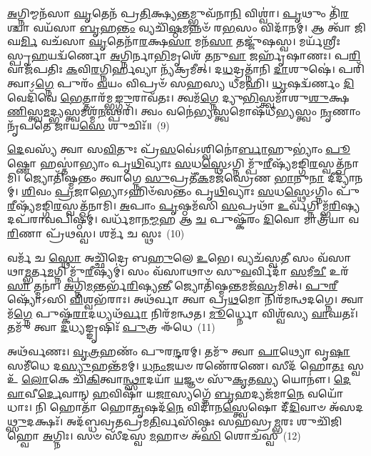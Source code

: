 \-\ul{𑌅}\-𑌗𑍍𑌨𑌿𑌮𑍍𑌮𑌨᳴𑌸𑌾 \ul{𑌘𑍃}\-𑌤𑍇𑌨᳴ 𑌪𑍍𑌰\-\ul{𑌤𑌿}\-𑌕𑍍𑌷𑍍𑌯\-\ul{𑌨𑍍𑌤}\-𑌮𑍍𑌭𑍁𑌵᳴𑌨𑌾\-\ul{𑌨𑌿} 𑌵𑌿𑌶𑍍𑌵𑌾॑। \ul{𑌪𑍃}\-𑌥𑍁𑌂 𑌤𑌿᳴\-\ul{𑌰}\-𑌶𑍍𑌚𑌾 𑌵𑌯᳴𑌸𑌾 \ul{𑌬𑍃}\-𑌹\-\ul{𑌨𑍍𑌤𑌂} 𑌵𑍍𑌯𑌚𑌿᳴\-\ul{𑌷𑍍𑌠}\-𑌮𑌨𑍍𑌨𑍞᳴ 𑌰\-\ul{𑌭}\-𑌸𑌂 𑌵𑌿𑌦𑌾᳴𑌨𑌮𑍍। 𑌆 𑌤𑍍𑌵𑌾᳴ 𑌜𑌿𑌘\-\ul{𑌰𑍍𑌮𑌿} 𑌵𑌚᳴𑌸𑌾 \ul{𑌘𑍃}\-𑌤𑍇𑌨𑌾᳴\-\ul{𑌰}\-𑌕𑍍𑌷\-\ul{𑌸𑌾} 𑌮𑌨᳴\-\ul{𑌸𑌾} 𑌤𑌜𑍍𑌜𑍁᳴𑌷𑌸𑍍𑌵। 𑌮𑌰𑍍𑌯᳴𑌶𑍍𑌰𑍀𑌃 𑌸𑍍𑌪𑍃\-\ul{𑌹}\-𑌯𑌦𑍍𑌵᳴𑌰𑍍𑌣𑍋 \ul{𑌅}\-𑌗𑍍𑌨𑌿𑌰𑍍𑌨𑌾\-\ul{𑌭𑌿}\-𑌮𑍃𑌶𑍇᳴ \ul{𑌤}\-𑌨𑍁\-\ul{𑌵𑌾} 𑌜𑌰𑍍\mbox{}𑌹𑍃᳴𑌷𑌾𑌣𑌃। 𑌪\-\ul{𑌰𑌿} 𑌵𑌾𑌜᳴𑌪𑌤𑌿𑌃 \ul{𑌕}\-𑌵𑌿\-\ul{𑌰}\-𑌗𑍍𑌨𑌿𑌰𑍍\mbox{}\-\ul{𑌹}\-𑌵𑍍𑌯𑌾 𑌨𑍍𑌯᳴𑌕𑍍𑌰𑌮𑍀𑌤𑍍। 𑌦\-\ul{𑌧}\-𑌦𑍍𑌰𑌤𑍍𑌨𑌾᳴𑌨𑌿 \ul{𑌦𑌾}\-𑌶𑍁𑌷𑍇॑। 𑌪𑌰𑌿᳴ 𑌤𑍍𑌵𑌾𑌽\-\ul{𑌗𑍍𑌨𑍇} 𑌪𑍁𑌰𑌂᳴ \ul{𑌵}\-𑌯𑌂 𑌵𑌿𑌪𑍍𑌰𑍞᳴ 𑌸𑌹𑌸𑍍𑌯 𑌧𑍀𑌮𑌹𑌿। \ul{𑌧𑍃}\-𑌷𑌦𑍍𑌵᳴𑌰𑍍𑌣𑌂 \ul{𑌦𑌿}\-𑌵𑍇𑌦𑌿᳴𑌵𑍇 \ul{𑌭𑍇}\-𑌤𑍍𑌤𑌾𑌰᳴𑌮𑍍𑌭\-\ul{𑌙𑍍𑌗𑍁}\-॒𑌰𑌾𑌵᳴𑌤𑌃। 𑌤𑍍𑌵𑌮᳴\-\ul{𑌗𑍍𑌨𑍇} 𑌦𑍍𑌯𑍁\-\ul{𑌭𑌿}\-𑌸𑍍𑌤𑍍𑌵𑌮𑌾᳴𑌶𑍁\-\ul{𑌶𑍁}\-𑌕𑍍𑌷\-\ul{𑌣𑌿}\-𑌸𑍍𑌤𑍍𑌵\-\ul{𑌮}\-𑌦𑍍𑌭𑍍𑌯𑌸𑍍𑌤𑍍𑌵𑌮𑌶𑍍𑌮᳴\-\ul{𑌨}\-𑌸𑍍𑌪𑌰𑌿᳴। 𑌤𑍍𑌵𑌂 𑌵𑌨𑍇॑\-\ul{𑌭𑍍𑌯}\-𑌸𑍍𑌤𑍍𑌵𑌮𑍋𑌷᳴𑌧𑍀\-\ul{𑌭𑍍𑌯}\-𑌸𑍍𑌤𑍍𑌵𑌂 \ul{𑌨𑍃}\-𑌣𑌾𑌂 𑌨𑍃᳴𑌪𑌤𑍇 𑌜𑌾𑌯\-\ul{𑌸𑍇} 𑌶𑍁𑌚𑌿𑌃᳴॥~(9)

{\anuvakamend[{\-\ul{𑌪𑍍𑌰}\-𑌤𑍂\-\ul{𑌰𑍍𑌵}\-𑌨𑍍𑌥𑍍𑌸𑍂𑌰𑍍𑌯᳴𑌸𑍍𑌯 𑌤𑌿\-\ul{𑌷𑍍𑌠} 𑌜𑌿𑌘᳴𑌰𑍍𑌮𑌿 \ul{𑌭𑍇}\-𑌤𑍍𑌤𑌾𑌰𑌂᳴ 𑌵𑌿𑍞\-\ul{𑌶}\-𑌤𑌿𑌶𑍍𑌚᳴}]}%

\-\ul{𑌦𑍇}\-𑌵𑌸𑍍𑌯᳴ 𑌤𑍍𑌵𑌾 𑌸\-\ul{𑌵𑌿}\-𑌤𑍁𑌃 𑌪𑍍𑌰᳴\-\ul{𑌸}\-𑌵𑍇॑\-𑌽𑌶𑍍𑌵𑌿𑌨𑍋॑\-\ul{𑌰𑍍𑌬𑌾}\-𑌹𑍁\-𑌭𑍍𑌯𑌾𑌂॑ \ul{𑌪𑍂}\-𑌷𑍍𑌣𑍋 𑌹𑌸𑍍𑌤𑌾॑𑌭𑍍𑌯𑌾𑌂 𑌪𑍃\-\ul{𑌥𑌿}\-𑌵𑍍𑌯𑌾𑌃 \ul{𑌸}\-𑌧\-\ul{𑌸𑍍𑌥𑍇}\-\-𑌽𑌗𑍍𑌨𑌿𑌮𑍍𑌪𑍁᳴\-\ul{𑌰𑍀}\-𑌷𑍍𑌯᳴𑌮𑌙𑍍𑌗𑌿\-\ul{𑌰}\-𑌸𑍍𑌵\-𑌤𑍍𑌖᳴𑌨𑌾𑌮𑌿। 𑌜𑍍𑌯𑍋𑌤𑌿᳴𑌷𑍍𑌮𑌨𑍍𑌤𑌂 𑌤𑍍𑌵𑌾𑌗𑍍𑌨𑍇 \ul{𑌸𑍁}\-𑌪𑍍𑌰𑌤𑍀᳴\-\ul{𑌕}\-𑌮𑌜᳴𑌸𑍍𑌰𑍇𑌣 \ul{𑌭𑌾}\-𑌨𑍁\-\ul{𑌨𑌾} 𑌦𑍀𑌦𑍍𑌯𑌾᳴𑌨𑌮𑍍। \ul{𑌶𑌿}\-𑌵𑌂 \ul{𑌪𑍍𑌰}\-𑌜𑌾𑌭𑍍𑌯𑍋\-𑌽𑌹𑌿𑍞᳴𑌸𑌨𑍍𑌤𑌂 𑌪𑍃\-\ul{𑌥𑌿}\-𑌵𑍍𑌯𑌾𑌃 \ul{𑌸}\-𑌧\-\ul{𑌸𑍍𑌥𑍇}\-\-𑌽𑌗𑍍𑌨𑌿𑌂 𑌪𑍁᳴\-\ul{𑌰𑍀}\-𑌷𑍍𑌯᳴𑌮𑌙𑍍𑌗𑌿\-\ul{𑌰}\-𑌸𑍍𑌵𑌤𑍍𑌖᳴𑌨𑌾𑌮𑌿। \ul{𑌅}\-𑌪𑌾𑌂 \ul{𑌪𑍃}\-𑌷𑍍𑌠𑌮᳴𑌸𑌿 \ul{𑌸}\-𑌪𑍍𑌰𑌥𑌾᳴ \ul{𑌉}\-𑌰𑍍𑌵᳴𑌗𑍍𑌨𑌿𑌮𑍍𑌭᳴\-\ul{𑌰𑌿}\-𑌷𑍍𑌯𑌦𑌪᳴𑌰𑌾𑌵𑌪𑌿𑌷𑍍𑌠𑌮𑍍। 𑌵𑌰𑍍𑌧᳴𑌮𑌾𑌨\-\ul{𑌮𑍍𑌮}\-𑌹 𑌆 \ul{𑌚} 𑌪𑍁𑌷𑍍𑌕᳴𑌰𑌂 \ul{𑌦𑌿}\-𑌵𑍋 𑌮𑌾𑌤𑍍𑌰᳴𑌯𑌾 𑌵\-\ul{𑌰𑌿}\-𑌣𑌾 𑌪𑍍𑌰᳴𑌥𑌸𑍍𑌵। 𑌶𑌰𑍍𑌮᳴ 𑌚 𑌸𑍍𑌥𑌃~(10)

𑌵𑌰𑍍𑌮᳴ 𑌚 \ul{𑌸𑍍𑌥𑍋} 𑌅𑌚𑍍𑌛𑌿᳴𑌦𑍍𑌰𑍇 𑌬\-\ul{𑌹𑍁}\-𑌲𑍇 \ul{𑌉}\-𑌭𑍇। 𑌵𑍍𑌯𑌚᳴𑌸𑍍𑌵\-\ul{𑌤𑍀} 𑌸𑌂 𑌵᳴𑌸𑌾𑌥𑌾\-\ul{𑌮𑍍𑌭}\-𑌰𑍍𑌤\-\ul{𑌮}\-𑌗𑍍𑌨𑌿𑌮𑍍𑌪𑍁᳴\-\ul{𑌰𑍀}\-𑌷𑍍𑌯𑌮𑍍॑। 𑌸𑌂 𑌵᳴𑌸𑌾𑌥𑌾𑍞 𑌸𑍁\-\ul{𑌵}\-𑌰𑍍𑌵𑌿𑌦𑌾᳴ \ul{𑌸}\-𑌮𑍀\-\ul{𑌚𑍀} 𑌉𑌰᳴\-\ul{𑌸𑌾} 𑌤𑍍𑌮𑌨𑌾॑। \ul{𑌅}\-𑌗𑍍𑌨𑌿\-\ul{𑌮}\-𑌨𑍍𑌤𑌰𑍍𑌭᳴\-\ul{𑌰𑌿}\-𑌷𑍍𑌯\-\ul{𑌨𑍍𑌤𑍀} 𑌜𑍍𑌯𑍋𑌤𑌿᳴𑌷𑍍𑌮\-\ul{𑌨𑍍𑌤}\-𑌮𑌜᳴\-\ul{𑌸𑍍𑌰}\-𑌮𑌿𑌤𑍍। \ul{𑌪𑍁}\-\-\ul{𑌰𑍀}\-𑌷𑍍𑌯𑍋᳴\-𑌽𑌸𑌿 \ul{𑌵𑌿}\-𑌶𑍍𑌵𑌭᳴𑌰𑌾𑌃। 𑌅𑌥᳴𑌰𑍍𑌵𑌾 𑌤𑍍𑌵𑌾 𑌪𑍍𑌰\-\ul{𑌥}\-𑌮𑍋 𑌨𑌿𑌰᳴𑌮𑌨𑍍𑌥𑌦𑌗𑍍𑌨𑍇। 𑌤𑍍𑌵𑌾𑌮᳴\-\ul{𑌗𑍍𑌨𑍇} 𑌪𑍁𑌷𑍍𑌕᳴\-\ul{𑌰𑌾}\-𑌦𑌧𑍍𑌯𑌥᳴\-\ul{𑌰𑍍𑌵𑌾} 𑌨𑌿𑌰᳴𑌮𑌨𑍍𑌥𑌤। \ul{𑌮𑍂}\-𑌰𑍍𑌧𑍍𑌨𑍋 𑌵𑌿𑌶𑍍𑌵᳴𑌸𑍍𑌯 \ul{𑌵𑌾}\-𑌘𑌤𑌃᳴। 𑌤𑌮𑍁᳴ 𑌤𑍍𑌵𑌾 \ul{𑌦}\-𑌧𑍍𑌯𑌙𑍍𑌙𑍃𑌷𑌿𑌃᳴ \ul{𑌪𑍁}\-𑌤𑍍𑌰 𑌈᳴𑌧𑍇~(11)

𑌅𑌥᳴𑌰𑍍𑌵𑌣𑌃। \ul{𑌵𑍃}\-\-\ul{𑌤𑍍𑌰}\-𑌹𑌣𑌂᳴ 𑌪𑍁𑌰\-\ul{𑌨𑍍𑌦}\-𑌰𑌮𑍍। 𑌤𑌮𑍁᳴ 𑌤𑍍𑌵𑌾 \ul{𑌪𑌾}\-𑌥𑍍𑌯𑍋 𑌵𑍃\-\ul{𑌷𑌾} 𑌸𑌮𑍀᳴𑌧𑍇 𑌦\-\ul{𑌸𑍍𑌯𑍁}\-𑌹𑌨𑍍𑌤᳴𑌮𑌮𑍍। \ul{𑌧}\-\-\ul{𑌨𑌂}\-\-\ul{𑌜}\-𑌯𑍞 𑌰𑌣𑍇᳴𑌰𑌣𑍇। 𑌸𑍀𑌦᳴ 𑌹𑍋\-\ul{𑌤𑌃} 𑌸𑍍𑌵 𑌉᳴ \ul{𑌲𑍋}\-𑌕𑍇 𑌚𑌿᳴\-\ul{𑌕𑌿}\-𑌤𑍍𑌵𑌾\-\ul{𑌨𑍍𑌥𑍍𑌸𑌾}\-𑌦𑌯𑌾᳴ \ul{𑌯}\-𑌜𑍍𑌞𑍞 𑌸𑍁᳴\-\ul{𑌕𑍃}\-𑌤\-\ul{𑌸𑍍𑌯} 𑌯𑍋𑌨𑍗॑। \ul{𑌦𑍇}\-\-\ul{𑌵𑌾}\-𑌵𑍀\-\ul{𑌰𑍍𑌦𑍇}\-𑌵𑌾𑌨𑍍 \ul{𑌹}\-𑌵𑌿𑌷𑌾᳴ 𑌯\-\ul{𑌜𑌾}\-𑌸𑍍𑌯𑌗𑍍𑌨𑍇᳴ \ul{𑌬𑍃}\-𑌹𑌦𑍍𑌯𑌜᳴𑌮𑌾\-\ul{𑌨𑍇} 𑌵𑌯𑍋᳴ 𑌧𑌾𑌃। 𑌨𑌿 𑌹𑍋𑌤𑌾᳴ 𑌹𑍋\-\ul{𑌤𑍃}\-𑌷𑌦᳴\-\ul{𑌨𑍇} 𑌵𑌿𑌦𑌾᳴𑌨\-\ul{𑌸𑍍𑌤𑍍𑌵𑍇}\-𑌷𑍋 𑌦𑍀᳴\-\ul{𑌦𑌿}\-𑌵𑌾𑍞 𑌅᳴𑌸𑌦\-\ul{𑌥𑍍𑌸𑍁}\-𑌦𑌕𑍍𑌷𑌃᳴। 𑌅𑌦᳴𑌬𑍍𑌧𑌵𑍍𑌰𑌤𑌪𑍍𑌰𑌮\-\ul{𑌤𑌿}\-𑌰𑍍𑌵𑌸𑌿᳴𑌷𑍍𑌠𑌃 𑌸𑌹𑌸𑍍𑌰\-\ul{𑌮𑍍𑌭}\-𑌰𑌃 𑌶𑍁𑌚𑌿᳴𑌜𑌿𑌹𑍍𑌵𑍋 \ul{𑌅}\-𑌗𑍍𑌨𑌿𑌃। 𑌸𑍞 𑌸𑍀᳴𑌦𑌸𑍍𑌵 \ul{𑌮}\-𑌹𑌾𑍞 𑌅᳴\-\ul{𑌸𑌿} 𑌶𑍋𑌚᳴𑌸𑍍𑌵~(12)

